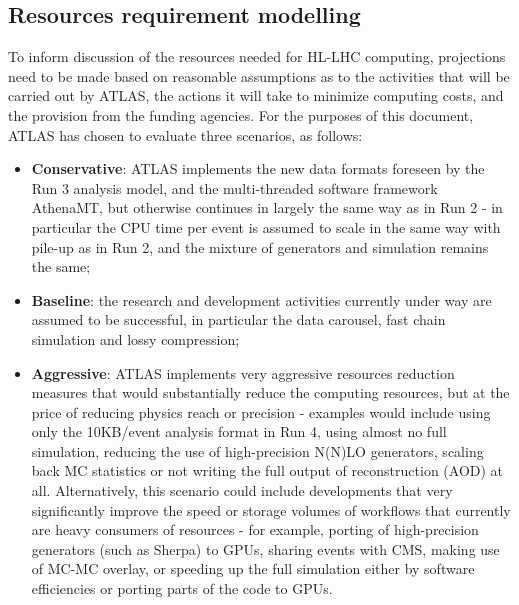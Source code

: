 \subsection{Resources requirement modelling}
To inform discussion of the resources needed for HL-LHC computing, projections need to be made based on reasonable assumptions as to the activities that will be carried out by ATLAS, the actions it will take to minimize computing costs, and the provision from the funding agencies. For the purposes of this document, ATLAS has chosen to evaluate three scenarios, as follows:
\begin{itemize}
    \item \textbf{Conservative}: ATLAS implements the new data formats foreseen by the Run 3 analysis model, and the multi-threaded software framework AthenaMT, but otherwise continues in largely the same way as in Run 2 - in particular the CPU time per event is assumed to scale in the same way with pile-up as in Run 2, and the mixture of generators and simulation remains the same; 
    \item \textbf{Baseline}: the research and development activities currently under way are assumed to be successful, in particular the data carousel, fast chain simulation and lossy compression; 
    \item \textbf{Aggressive}: ATLAS implements very aggressive resources reduction measures that would substantially reduce the computing resources, but at the price of reducing physics reach or precision - examples would include using only the 10KB/event analysis format in Run 4, using almost no full simulation, reducing the use of high-precision N(N)LO generators, scaling back MC statistics or not writing the full output of reconstruction (AOD) at all. Alternatively, this scenario could include developments that very significantly improve the speed or storage volumes of workflows that currently are heavy consumers of resources - for example, porting of high-precision generators (such as Sherpa) to GPUs, sharing events with CMS, making use of MC-MC overlay, or speeding up the full simulation either by software efficiencies or porting parts of the code to GPUs.
\end{itemize}
